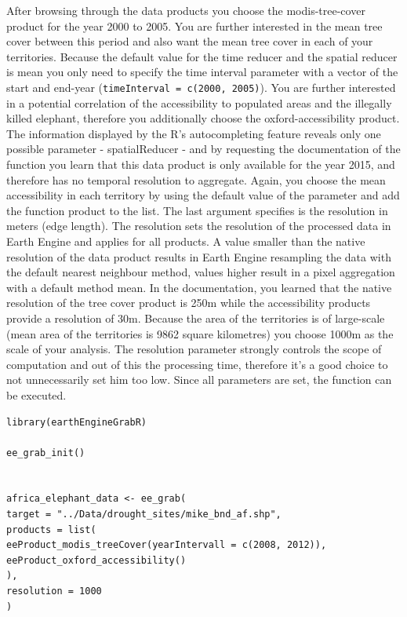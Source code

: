 After browsing through the data products you choose the modis-tree-cover product for the year 2000 to 2005. You are further interested in the mean tree cover between this period and also want the mean tree cover in each of your territories. Because the default value for the time reducer and the spatial reducer is mean you only need to specify the time interval parameter with a vector of the start and end-year (\texttt{timeInterval = c(2000, 2005)}). You are further interested in a potential correlation of the accessibility to populated areas and the illegally killed elephant, therefore you additionally choose the oxford-accessibility product. The information displayed by the R's autocompleting feature reveals only one possible parameter - spatialReducer - and by requesting the documentation of the function you learn that this data product is only available for the year 2015, and therefore has no temporal resolution to aggregate. Again, you choose the mean accessibility in each territory by using the default value of the parameter and add the function product to the list. The last argument specifies is the resolution in meters (edge length). The resolution sets the resolution of the processed data in Earth Engine and applies for all products. A value smaller than the native resolution of the data product results in Earth Engine resampling the data with the default nearest neighbour method, values higher result in a pixel aggregation with a default method mean. In the documentation, you learned that the native resolution of the tree cover product is 250m while the accessibility products provide a resolution of 30m. Because the area of the territories is of large-scale (mean area of the territories is 9862 square kilometres) you choose 1000m as the scale of your analysis. The resolution parameter strongly controls the scope of computation and out of this the processing time, therefore it's a good choice to not unnecessarily set him too low. 
Since all parameters are set, the function can be executed. 

\begin{lstlisting}
library(earthEngineGrabR)

ee_grab_init()


africa_elephant_data <- ee_grab(
target = "../Data/drought_sites/mike_bnd_af.shp",
products = list(
eeProduct_modis_treeCover(yearIntervall = c(2008, 2012)),
eeProduct_oxford_accessibility()
),
resolution = 1000
)
\end{lstlisting}


